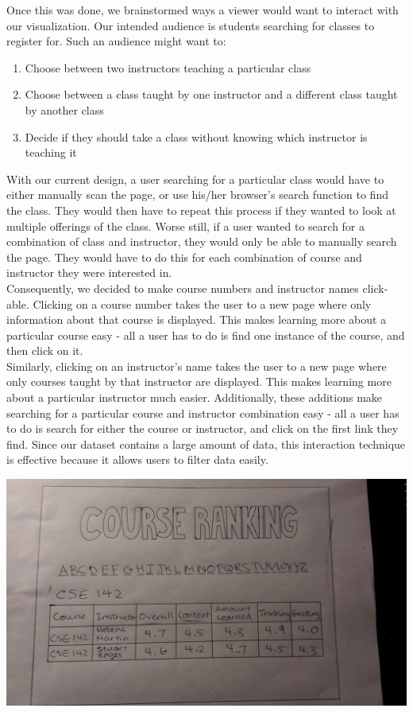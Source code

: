 \documentclass{article}
\begin{document}
Once this was done, we brainstormed ways a viewer would want to interact with our visualization. Our intended audience is students searching for classes to register for. Such an audience might want to:

\begin{enumerate}
    \item Choose between two instructors teaching a particular class
    \item Choose between a class taught by one instructor and a different class taught by another class
    \item Decide if they should take a class without knowing which instructor is teaching it
\end{enumerate}

With our current design, a user searching for a particular class would have to either manually scan the page, or use his/her browser's search function to find the class. They would then have to repeat this process if they wanted to look at multiple offerings of the class. Worse still, if a user wanted to search for a combination of class and instructor, they would only be able to manually search the page. They would have to do this for each combination of course and instructor they were interested in.\\

Consequently, we decided to make course numbers and instructor names click-able. Clicking on a course number takes the user to a new page where only information about that course is displayed. This makes learning more about a particular course easy - all a user has to do is find one instance of the course, and then click on it.\\

Similarly, clicking on an instructor's name takes the user to a new page where only courses taught by that instructor are displayed. This makes learning more about a particular instructor much easier. Additionally, these additions make searching for a particular course and instructor combination easy - all a user has to do is search for either the course or instructor, and click on the first link they find. Since our dataset contains a large amount of data, this interaction technique is effective because it allows users to filter data easily.

\begin{center}
    \includegraphics[width=\textwidth]{4.png}
\end{center}
\end{document}
